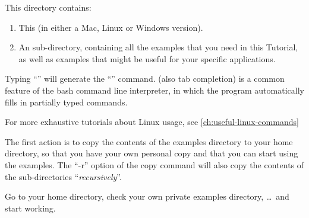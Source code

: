 This directory contains:

\begin{enumerate}
  \item This  (in either a Mac, Linux or Windows version).
  \item An  sub-directory, containing all the
    examples that you need in this Tutorial, as well as examples that might be
    useful for your specific applications.
\end{enumerate}

\begin{prompt}
\end{prompt}

\begin{tip}
Typing ``'' will generate the
``'' command. (also tab completion) is a common feature of the bash command line
interpreter, in which the program automatically fills in partially typed
commands.
\end{tip}

\begin{tip}
For more exhaustive tutorials about Linux usage, see \ref{ch:useful-linux-commands}
\end{tip}

The first action is to copy the contents of the \hpc examples directory
to your home directory, so that you have your own personal copy and that
you can start using the examples. The ``-r'' option of the copy command
will also copy the contents of the sub-directories ``\emph{recursively}''.

\begin{prompt}
\end{prompt}

Go to your home directory, check your own private examples directory, \dots\
and start working.


